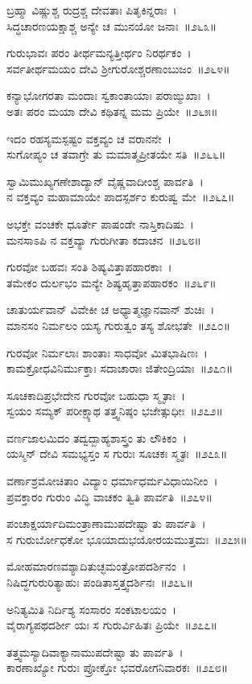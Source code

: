 ಬ್ರಹ್ಮಾ ವಿಷ್ಣುಶ್ಚ ರುದ್ರಶ್ಚ ದೇವತಾಃ ಪಿತೃಕಿನ್ನರಾಃ~।\\
ಸಿದ್ಧಚಾರಣಯಕ್ಷಾಶ್ಚ ಅನ್ಯೇ ಚ ಮುನಯೋ ಜನಾಃ~॥೨೬೩॥

ಗುರುಭಾವಃ ಪರಂ ತೀರ್ಥಮನ್ಯತ್ತೀರ್ಥಂ ನಿರರ್ಥಕಂ~।\\
ಸರ್ವತೀರ್ಥಮಯಂ ದೇವಿ ಶ್ರೀಗುರೋಶ್ಚರಣಾಂಬುಜಂ~॥೨೬೪॥

ಕನ್ಯಾಭೋಗರತಾ ಮಂದಾಃ ಸ್ವಕಾಂತಾಯಾಃ ಪರಾಙ್ಮುಖಾಃ~।\\
ಅತಃ ಪರಂ ಮಯಾ ದೇವಿ ಕಥಿತನ್ನ ಮಮ ಪ್ರಿಯೇ~॥೨೬೫॥

ಇದಂ ರಹಸ್ಯಮಸ್ಪಷ್ಟಂ ವಕ್ತವ್ಯಂ ಚ ವರಾನನೇ~।\\
ಸುಗೋಪ್ಯಂ ಚ ತವಾಗ್ರೇ ತು ಮಮಾತ್ಮಪ್ರೀತಯೇ ಸತಿ~॥೨೬೬॥

ಸ್ವಾಮಿಮುಖ್ಯಗಣೇಶಾದ್ಯಾನ್ ವೈಷ್ಣವಾದೀಂಶ್ಚ ಪಾರ್ವತಿ~।\\
ನ ವಕ್ತವ್ಯಂ ಮಹಾಮಾಯೇ ಪಾದಸ್ಪರ್ಶಂ ಕುರುಷ್ವ ಮೇ~॥೨೬೭॥

ಅಭಕ್ತೇ ವಂಚಕೇ ಧೂರ್ತೇ ಪಾಷಂಡೇ ನಾಸ್ತಿಕಾದಿಷು~।\\
ಮನಸಾಽಪಿ ನ ವಕ್ತವ್ಯಾ ಗುರುಗೀತಾ ಕದಾಚನ~॥೨೬೮॥

ಗುರವೋ ಬಹವಃ ಸಂತಿ ಶಿಷ್ಯವಿತ್ತಾಪಹಾರಕಾಃ~।\\
ತಮೇಕಂ ದುರ್ಲಭಂ ಮನ್ಯೇ ಶಿಷ್ಯಹೃತ್ತಾಪಹಾರಕಂ~॥೨೬೯॥

ಚಾತುರ್ಯವಾನ್ ವಿವೇಕೀ ಚ ಅಧ್ಯಾತ್ಮಜ್ಞಾನವಾನ್ ಶುಚಿಃ~।\\
ಮಾನಸಂ ನಿರ್ಮಲಂ ಯಸ್ಯ ಗುರುತ್ವಂ ತಸ್ಯ ಶೋಭತೇ~॥೨೭೦॥

ಗುರವೋ ನಿರ್ಮಲಾಃ ಶಾಂತಾಃ ಸಾಧವೋ ಮಿತಭಾಷಿಣಃ~।\\
ಕಾಮಕ್ರೋಧವಿನಿರ್ಮುಕ್ತಾಃ ಸದಾಚಾರಾಃ ಜಿತೇಂದ್ರಿಯಾಃ~॥೨೭೧॥

ಸೂಚಕಾದಿಪ್ರಭೇದೇನ ಗುರವೋ ಬಹುಧಾ ಸ್ಮೃತಾಃ~।\\
ಸ್ವಯಂ ಸಮ್ಯಕ್ ಪರೀಕ್ಷ್ಯಾಥ ತತ್ತ್ವನಿಷ್ಠಂ ಭಜೇತ್ಸುಧೀಃ~॥೨೭೨॥

ವರ್ಣಜಾಲಮಿದಂ ತದ್ವದ್ಬಾಹ್ಯಶಾಸ್ತ್ರಂ ತು ಲೌಕಿಕಂ~।\\
ಯಸ್ಮಿನ್ ದೇವಿ ಸಮಭ್ಯಸ್ತಂ ಸ ಗುರುಃ ಸೂಚಕಃ ಸ್ಮೃತಃ~॥೨೭೩॥

ವರ್ಣಾಶ್ರಮೋಚಿತಾಂ ವಿದ್ಯಾಂ ಧರ್ಮಾಧರ್ಮವಿಧಾಯಿನೀಂ~।\\
ಪ್ರವಕ್ತಾರಂ ಗುರುಂ ವಿದ್ಧಿ ವಾಚಕಂ ತ್ವಿತಿ ಪಾರ್ವತಿ~॥೨೭೪॥

ಪಂಚಾಕ್ಷರ್ಯಾದಿಮಂತ್ರಾಣಾಮುಪದೇಷ್ಟಾ ತು ಪಾರ್ವತಿ~।\\
ಸ ಗುರುರ್ಬೋಧಕೋ ಭೂಯಾದುಭಯೋರಯಮುತ್ತಮಃ~॥೨೭೫॥

ಮೋಹಮಾರಣವಶ್ಯಾದಿತುಚ್ಛಮಂತ್ರೋಪದರ್ಶಿನಂ~।\\
ನಿಷಿದ್ಧಗುರುರಿತ್ಯಾಹುಃ ಪಂಡಿತಾಸ್ತತ್ತ್ವದರ್ಶಿನಃ~॥೨೭೬॥

ಅನಿತ್ಯಮಿತಿ ನಿರ್ದಿಶ್ಯ ಸಂಸಾರಂ ಸಂಕಟಾಲಯಂ~।\\
ವೈರಾಗ್ಯಪಥದರ್ಶೀ ಯಃ ಸ ಗುರುರ್ವಿಹಿತಃ ಪ್ರಿಯೇ~॥೨೭೭॥

ತತ್ತ್ವಮಸ್ಯಾದಿವಾಕ್ಯಾನಾಮುಪದೇಷ್ಟಾ ತು ಪಾರ್ವತಿ~।\\
ಕಾರಣಾಖ್ಯೋ ಗುರುಃ ಪ್ರೋಕ್ತೋ ಭವರೋಗನಿವಾರಕಃ~॥೨೭೮॥

